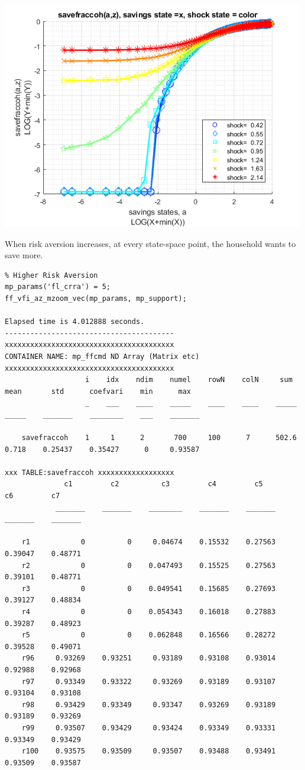 \documentclass[
]{book}
\begin{document}
\includegraphics[width=5.20833in,height=\textheight]{img/fx_vfi_az_mzoom_vec_images/figure_5.png}

When risk aversion increases, at every state-space point, the household
wants to save more.

\begin{verbatim}
% Higher Risk Aversion
mp_params('fl_crra') = 5;
ff_vfi_az_mzoom_vec(mp_params, mp_support);

Elapsed time is 4.012888 seconds.
----------------------------------------
xxxxxxxxxxxxxxxxxxxxxxxxxxxxxxxxxxxxxxxx
CONTAINER NAME: mp_ffcmd ND Array (Matrix etc)
xxxxxxxxxxxxxxxxxxxxxxxxxxxxxxxxxxxxxxxx
                   i    idx    ndim    numel    rowN    colN     sum     mean       std      coefvari    min      max  
                   _    ___    ____    _____    ____    ____    _____    _____    _______    ________    ___    _______

    savefraccoh    1     1      2       700     100      7      502.6    0.718    0.25437    0.35427      0     0.93587

xxx TABLE:savefraccoh xxxxxxxxxxxxxxxxxx
              c1         c2          c3         c4         c5         c6         c7   
            _______    _______    ________    _______    _______    _______    _______

    r1            0          0     0.04674    0.15532    0.27563    0.39047    0.48771
    r2            0          0    0.047493    0.15525    0.27563    0.39101    0.48771
    r3            0          0    0.049541    0.15685    0.27693    0.39127    0.48834
    r4            0          0    0.054343    0.16018    0.27883    0.39287    0.48923
    r5            0          0    0.062848    0.16566    0.28272    0.39528    0.49071
    r96     0.93269    0.93251     0.93189    0.93108    0.93014    0.92988    0.92968
    r97     0.93349    0.93322     0.93269    0.93189    0.93107    0.93104    0.93108
    r98     0.93429    0.93349     0.93347    0.93269    0.93189    0.93189    0.93269
    r99     0.93507    0.93429     0.93424    0.93349    0.93331    0.93349    0.93429
    r100    0.93575    0.93509     0.93507    0.93488    0.93491    0.93509    0.93587
\end{verbatim}
\end{document}
